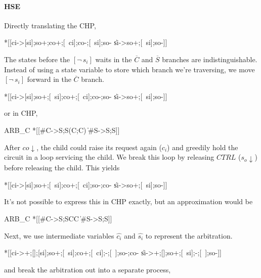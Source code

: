 \documentclass[aer.tex]{subfiles}
\begin{document}
\paragraph{HSE}

Directly translating the CHP,

\begin{hse}
*[[ci->[si];so+;co+;[~ci];co-;[~si];so-
  \|si->so+;[~si];so-]]
\end{hse}

The states before the $[\neg\,s_i]$ waits in the $\overline{C}$ and $\overline{S}$ branches are indistinguishable. Instead of using a state variable to store which branch we're traversing, we move $[\neg\,s_i]$ forward in the $\overline{C}$ branch. 

\begin{hse}
*[[ci->[si];so+;[~si];co+;[~ci];co-;so-
  \|si->so+;[~si];so-]]
\end{hse}

\noindent or in CHP,

\begin{csp}
ARB_C\equiv
*[[#C->S;S\star(C;C)
  \|#S->S;S]]
\end{csp}

\noindent After $co\!\downarrow$, the child could raise its request again ($c_i$) and greedily hold the circuit in a loop servicing the child. 
We break this loop by releasing $CTRL$ ($s_o\!\downarrow$) before releasing the child. This yields

\begin{hse}
*[[ci->[si];so+;[~si];co+;[~ci];so-;co-
  \|si->so+;[~si];so-]]
\end{hse}

\noindent It's not possible to express this in CHP exactly, but an approximation would be

\begin{csp}
ARB_C\equiv
*[[#C->S;S\star\!C\star\!C
  \|#S->S;S]]
\end{csp}

\noindent Next, we use intermediate variables $\hat{c_i}$ and $\hat{s_i}$ to represent the arbitration.

\begin{hse}
*[[ci->+;[];[si];so+;[~si];co+;[~ci];-;[~];so-;co-
  \|si->+;[];so+;[~si];-;[~];so-]]
\end{hse}

\noindent and break the arbitration out into a separate process,
\end{document}
